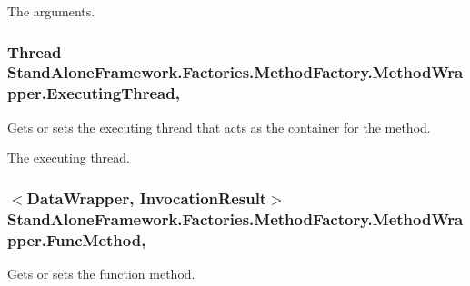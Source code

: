 The arguments.\hypertarget{class_stand_alone_framework_1_1_factories_1_1_method_factory_1_1_method_wrapper_a53705992cdbe995cf7099e806ff2b51c}{
\subsubsection[{Executing\+Thread}]{\setlength{\rightskip}{0pt plus 5cm}Thread Stand\+Alone\+Framework.\+Factories.\+Method\+Factory.\+Method\+Wrapper.\+Executing\+Thread\hspace{0.3cm}{\ttfamily [get]}, {\ttfamily [set]}}}\label{class_stand_alone_framework_1_1_factories_1_1_method_factory_1_1_method_wrapper_a53705992cdbe995cf7099e806ff2b51c}


Gets or sets the executing thread that acts as the container for the method. 

The executing thread.\hypertarget{class_stand_alone_framework_1_1_factories_1_1_method_factory_1_1_method_wrapper_a3a7ae8b79a922646649ffea70f5e60e9}{
\subsubsection[{Func\+Method}]{$<${\bf Data\+Wrapper}, {\bf Invocation\+Result}$>$ Stand\+Alone\+Framework.\+Factories.\+Method\+Factory.\+Method\+Wrapper.\+Func\+Method\hspace{0.3cm}{\ttfamily [get]}, {\ttfamily [set]}}}\label{class_stand_alone_framework_1_1_factories_1_1_method_factory_1_1_method_wrapper_a3a7ae8b79a922646649ffea70f5e60e9}


Gets or sets the function method. 

